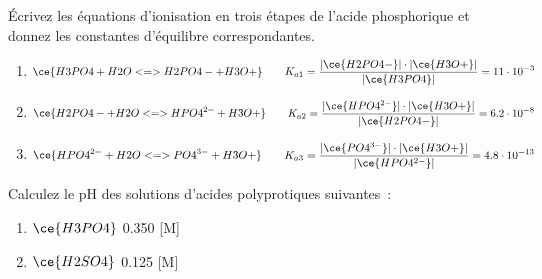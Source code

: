 \documentclass[
  11pt,
  a4paper,
  openany]{book}
\providecommand{\tightlist}{%
  \setlength{\itemsep}{0pt}\setlength{\parskip}{0pt}}
\begin{document}
\begin{Exercise}
Écrivez les équations d'ionisation en trois étapes de l'acide phosphorique et donnez les constantes d'équilibre correspondantes.

\end{Exercise}

\begin{Answer}

\begin{enumerate}
\def\labelenumi{\arabic{enumi}.}
\tightlist
\item
  \[
  \begin{split}
  \ce{H3PO4 + H2O <=> H2PO4- + H3O+}
  \end{split}
  \qquad
  \begin{split}
  K_{a1} = \frac{|\ce{H2PO4-}| \cdot |\ce{H3O+}|}{|\ce{H3PO4}|} = 11 \cdot 10^{-3}
  \end{split}
  \]
\item
  \[
  \begin{split}
  \ce{H2PO4- + H2O <=> HPO4^{2-} + H3O+}
  \end{split}
  \qquad
  \begin{split}
  K_{a2} = \frac{|\ce{HPO4^{2-}}| \cdot |\ce{H3O+}|}{|\ce{H2PO4-}|} = 6.2 \cdot 10^{-8}
  \end{split}
  \]
\item
  \[
  \begin{split}
  \ce{HPO4^{2-} + H2O <=> PO4^{3-} + H3O+}
  \end{split}
  \qquad
  \begin{split}
  K_{a3} = \frac{|\ce{PO4^{3-}}| \cdot |\ce{H3O+}|}{|\ce{HPO4^{2-}}|} = 4.8 \cdot 10^{-13}
  \end{split}
  \]
\end{enumerate}

\end{Answer}

\clearpage

\begin{Exercise}

Calculez le pH des solutions d'acides polyprotiques suivantes~:

\begin{enumerate}
\def\labelenumi{\alph{enumi}.}
\tightlist
\item
  \(\ce{H3PO4}\) 0.350 {[}M{]}
\item
  \(\ce{H2SO4}\) 0.125 {[}M{]}
\end{enumerate}

\end{Exercise}
\end{document}
